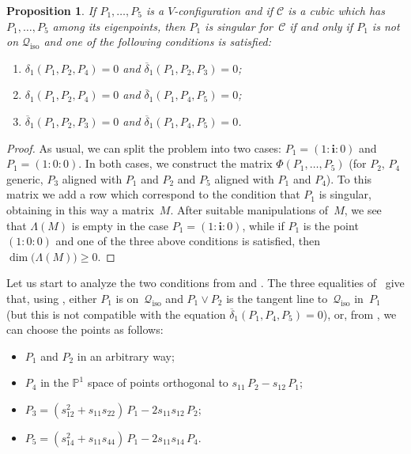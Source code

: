 \documentclass{amsart}
\theoremstyle{plain}
\newtheorem{prop}[lemma]{Proposition}
\theoremstyle{definition}
\newcommand{\p}{\mathbb{P}}
\newcommand{\iso}{\mathcal{Q}_{\mathrm{iso}}}
\newcommand{\iii}{\textbf{i}}
\begin{document}
\begin{prop}
\label{proposition:P1_sing}
If $P_1, \dots, P_5$ is a $V$-configuration and if
$\mathcal{C}$ is a cubic which
has $P_1, \dots, P_5$ among its eigenpoints, then $P_1$ is
singular for~$\mathcal{C}$ if
and only if $P_1$ is not on $\iso$ and one of the following conditions
is satisfied:
%
\begin{enumerate}
  \item $\delta_1(P_1, P_2, P_4) = 0$ and $\overline{\delta}_1(P_1, P_2, P_3) = 0$;
  \item $\delta_1(P_1, P_2, P_4) = 0$ and $\overline{\delta}_1(P_1, P_4, P_5) = 0$;
  \item $\overline{\delta}_1(P_1, P_2, P_3) = 0$ and
  $\overline{\delta}_1(P_1, P_4, P_5) = 0$.
\end{enumerate}
%
\end{prop}
\begin{proof}
As usual, we can split the problem into two cases: $P_1 = (1: \iii: 0)$
and $P_1 = (1: 0: 0)$. In both cases, we construct the matrix
$\Phi(P_1, \dots, P_5)$ (for $P_2$, $P_4$ generic, $P_3$ aligned with
$P_1$ and $P_2$ and $P_5$ aligned with $P_1$ and $P_4$). To this matrix we add
a row which correspond to the condition that $P_1$ is singular, obtaining
in this way a matrix~$M$. After
suitable manipulations of~$M$, we see that $\Lambda(M)$ is empty
in the case $P_1=(1: \iii: 0)$, while if $P_1$ is the point~$(1:0:0)$
and one of the three above conditions is satisfied, then
$\dim \bigl( \Lambda(M) \bigr) \geq 0$.
\end{proof}

Let us start to analyze the two conditions from  and .
The three equalities of~ give that,
using , either $P_1$ is on~$\iso$ and
$P_1\vee P_2$ is the tangent line to~$\iso$ in~$P_1$ (but this is not compatible
with the equation $\overline{\delta}_1(P_1, P_4, P_5)=0$), or,
from , we can choose the points as follows:
%
\begin{itemize}
  \item $P_1$ and $P_2$ in an arbitrary way;
  \item $P_4$ in the $\p^1$
  space of points orthogonal to $s_{11} \, P_2 - s_{12} \, P_1$;
  \item $P_3 = (s_{12}^2+s_{11}s_{22}) \, P_1 - 2s_{11}s_{12} \, P_2$;
  \item $P_5 = (s_{14}^2+s_{11}s_{44}) \, P_1 - 2s_{11}s_{14} \, P_4$.
\end{itemize}
%
\end{document}
